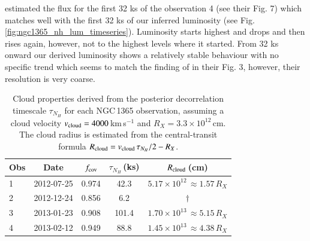 \documentclass{aa}
\begin{document}
\citet{Rivers2015} estimated the flux for the first 32 ks of the observation 4 (see their Fig. 7) which matches well with the first 32 ks of our inferred luminosity (see Fig. \ref{fig:ngc1365_nh_lum_timeseries}). Luminosity starts highest and drops and then rises again, however, not to the highest levels where it started. From 32 ks onward our derived luminosity shows a relatively stable behaviour with no specific trend which seems to match the finding of \citet{Rivers2015} in their Fig. 3, however, their resolution is very coarse. \\

\begin{table}[ht]
  \centering
  \caption{Cloud properties derived from the posterior decorrelation
    timescale $\tau_{N_H}$ for each NGC\,1365 observation, assuming
    a cloud velocity $v_{\rm cloud} = 4000$\,km\,s$^{-1}$ and
    $R_X = 3.3\times10^{12}$\,cm. The cloud radius is estimated from
    the central-transit formula $R_{\rm cloud} = v_{\rm cloud}\,
    \tau_{N_H}/2 - R_X$.}
  \label{tab:cloud_properties}
  \begin{tabular}{lcccc}
    \hline\hline
    Obs & Date &  $f_{\rm cov}$ & $\tau_{N_H}$\,(ks) &
      $R_{\rm cloud}$\,(cm) \\
    \hline
    1 & 2012-07-25 & 0.974 & 42.3  & $5.17\times10^{12}$\,$\approx 1.57\,R_X$ \\
    2 & 2012-12-24 & 0.856 &  6.2  & $\dagger$ \\
    3 & 2013-01-23 & 0.908 & 101.4 & $1.70\times10^{13}$\,$\approx 5.15\,R_X$ \\
    4 & 2013-02-12 & 0.949 &  88.8 & $1.45\times10^{13}$\,$\approx 4.38\,R_X$ \\
    \hline\hline
  \end{tabular}
\end{table}
\end{document}
